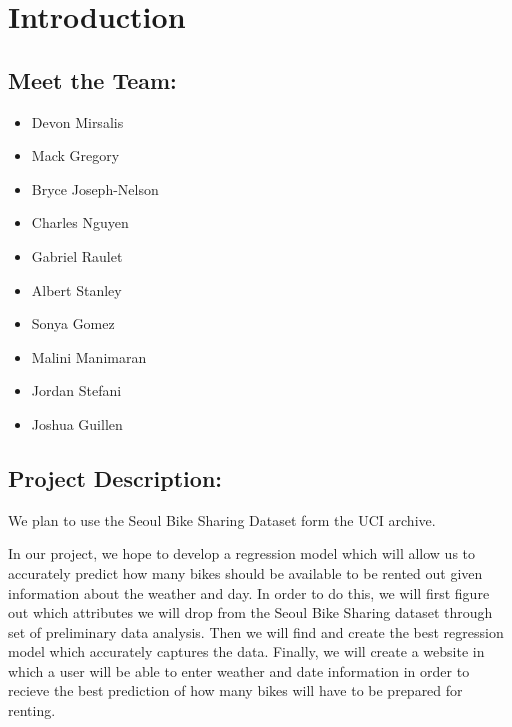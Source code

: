 \documentclass[main.tex]{subfiles}
\begin{document}
\section{Introduction}
\subsection{Meet the Team:}

\begin{itemize}
\item Devon Mirsalis
\item Mack Gregory
\item Bryce Joseph-Nelson
\item Charles Nguyen
\item Gabriel Raulet
\item Albert Stanley
\item Sonya Gomez
\item Malini Manimaran
\item Jordan Stefani
\item Joshua Guillen
\end{itemize}

\subsection{Project Description:}

We plan to use the Seoul Bike Sharing Dataset form the UCI archive. 

In our project, we hope to develop a regression model which will allow us to accurately predict how many bikes should be available to be rented out given information about the weather and day. In order to do this, we will first figure out which attributes we will drop from the Seoul Bike Sharing dataset through set of preliminary data analysis. Then we will find and create the best regression model which accurately captures the data. Finally, we will create a website in which a user will be able to enter weather and date information in order to recieve the best prediction of how many bikes will have to be prepared for renting. 
\end{document}
